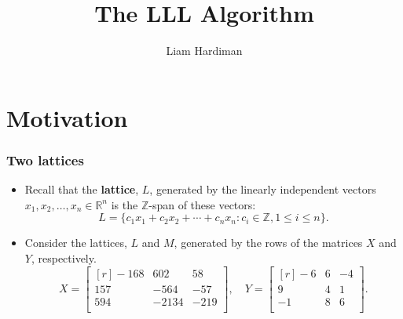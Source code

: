 \documentclass{beamer}
\title{The LLL Algorithm}
\author{Liam Hardiman}
\newcommand{\integers}{\mathbb{Z}}
\newcommand{\reals}{\mathbb{R}}
\begin{document}
\maketitle

\section{Motivation}
\begin{frame}
	\frametitle{Two lattices}
	\begin{itemize}
		\item Recall that the \textbf{lattice}, $L$, generated by the linearly independent vectors $x_1, x_2, \ldots, x_n\in \reals^n$ is the $\integers$-span of these vectors:
		\[
		L = \{c_1x_1 + c_2x_2 + \cdots + c_nx_n: c_i \in \integers, 1\leq i \leq n\}.
		\]\pause

		\item Consider the lattices, $L$ and $M$, generated by the rows of the matrices $X$ and $Y$, respectively.	
		\[
		X = \begin{bmatrix*}[r]
			-168 & 602 & 58\\
			157 & -564 & -57\\
			594 & -2134 & -219\\
		\end{bmatrix*}, \quad
		Y = \begin{bmatrix*}[r]
			-6 & 6 & -4\\
			9 & 4 & 1\\
			-1 & 8 & 6\\
		\end{bmatrix*}.
		\]
	\end{itemize}
\end{frame}
\end{document}
